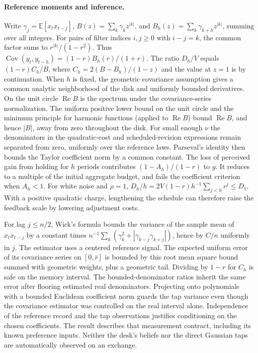 \documentclass[12pt]{article}
\theoremstyle{definition}
\theoremstyle{remark}
\begin{document}
\paragraph{Reference moments and inference.}
Write $\gamma_j=\mathbb E[x_t x_{t-j}]$, $B(z)=\sum_k\gamma_k z^{|k|}$, and
$B_h(z)=\sum_k\gamma_{k+h}z^{|k|}$, summing over all integers. For pairs of filter
indices $i,j\ge0$ with $i-j=k$, the common factor sums to $r^{|k|}/(1-r^2)$. Thus
$\operatorname{Cov}(y_t,y_{t-h})=(1-r)B_h(r)/(1+r)$. The ratio $D_h/V$ equals
$(1-r)C_h/B$, where $C_h=2(B-B_h)/(1-z)$ and the value at $z=1$ is by continuation.
When $h$ is fixed, the geometric covariance assumption gives a common analytic
neighborhood of the disk and uniformly bounded derivatives. On the unit circle
$\operatorname{Re}B$ is the spectrum under the covariance-series normalization.
The uniform positive lower bound on the unit circle and the minimum principle for harmonic functions (applied to $\operatorname{Re}B$) bound $\operatorname{Re}B$, and hence $|B|$, away from zero
throughout the disk. For small enough $\nu$ the denominators in the quadratic-cost
and scheduled-revision expressions remain separated from zero, uniformly over the
reference laws. Parseval's identity then bounds the Taylor coefficient norm by a
common constant. The loss of perceived gain from holding for $h$ periods contributes
$(1-A_h)/(1-r)$ to $g$. It reduces to a multiple of the initial aggregate budget,
and fails the coefficient criterion when $A_h<1$. For white noise and $\rho=1$,
$D_h/h=2V(1-r)h^{-1}\sum_{j<h}r^j\le D_1$. With a positive quadratic charge,
lengthening the schedule can therefore raise the feedback scale by lowering
adjustment costs.

For lag $j\le n/2$, Wick's formula bounds the variance of the sample mean of
$x_t x_{t-j}$ by a constant times $n^{-1}\sum_k(\gamma_k^2+
|\gamma_{k-j}\gamma_{k+j}|)$, hence by $C/n$ uniformly in $j$. The estimator uses a
centered reference signal. The expected uniform error of its covariance series on
$[0,\bar r]$ is bounded by this root mean square bound summed with geometric weights,
plus a geometric tail. Dividing by $1-r$ for $C_h$ is safe on the memory interval.
The bounded-denominator ratios inherit the same error after flooring estimated real
denominators. Projecting onto polynomials with a bounded Euclidean coefficient norm
guards the tap variance even though the covariance estimator was controlled on the
real interval alone. Independence of the reference record and the tap observations
justifies conditioning on the chosen coefficients. The result describes that
measurement contract, including its known preference inputs. Neither the desk's
beliefs nor the direct Gaussian taps are automatically observed on an exchange.
\end{document}
